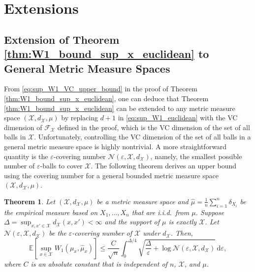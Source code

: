 \documentclass[11pt,letterpaper]{article}
\newtheorem{theorem}{Theorem} %
\newtheorem{lemma}{Lemma} %
\theoremstyle{definition}
\numberwithin{equation}{section}
\newcommand{\cF}{\mathcal{F}}
\newcommand{\cN}{\mathcal{N}}
\newcommand{\cX}{\mathcal{X}}
\newcommand{\E}{\mathbb{E}} %
\renewcommand{\P}{\mathbb{P}}
\renewcommand{\epsilon}{\varepsilon}
\begin{document}



\section{Extensions}
\label{sec:extensions}


\subsection{Extension of Theorem \ref{thm:W1_bound_sup_x_euclidean} to General Metric Measure Spaces}
\label{sec:W1_bound_sup_x_general}
From \eqref{eq:sup_W1_VC_upper_bound} in the proof of Theorem \ref{thm:W1_bound_sup_x_euclidean}, one can deduce that Theorem \ref{thm:W1_bound_sup_x_euclidean} can be extended to any metric measure space $(\cX, d_\cX, \mu)$ by replacing $d + 1$ in \eqref{eq:sup_W1_euclidean} with the VC dimension of $\cF_\cX$ defined in the proof, which is the VC dimension of the set of all balls in $\cX$. Unfortunately, controlling the VC dimension of the set of all balls in a general metric measure space is highly nontrivial. A more straightforward quantity is the $\epsilon$-covering number $\cN(\epsilon, \cX, d_\cX)$, namely, the smallest possible number of $\epsilon$-balls to cover $\cX$. The following theorem derives an upper bound using the covering number for a general bounded metric measure space $(\cX, d_\cX, \mu)$. 

\begin{theorem}
    \label{thm:W1_bound_sup_x_general}
    Let $(\cX, d_\cX, \mu)$ be a metric measure space and $\hat{\mu} = \frac{1}{n} \sum_{i = 1}^{n} \delta_{X_i}$ be the empirical measure based on $X_1, \ldots, X_n$ that are i.i.d.\ from $\mu$. Suppose $\Delta = \sup_{x, x' \in \cX} d_\cX(x, x') < \infty$ and the support of $\mu$ is exactly $\cX$. Let $\cN(\epsilon, \cX, d_\cX)$ be the $\epsilon$-covering number of $\cX$ under $d_\cX$. Then,
    \begin{equation}
        \label{eq:E_sup_W1_upper_bound_chaining}
        \E\left[\sup_{x \in \cX} W_1(\mu_x, \hat{\mu}_x)\right] \le \frac{C}{\sqrt{n}} \int_{0}^{\Delta / 4} \sqrt{\frac{\Delta}{\epsilon} + \log \cN(\epsilon, \cX, d_\cX)} \, \mathrm{d} \epsilon,
    \end{equation}
    where $C$ is an absolute constant that is independent of $n$, $\cX$, and $\mu$.
\end{theorem}
\end{document}
